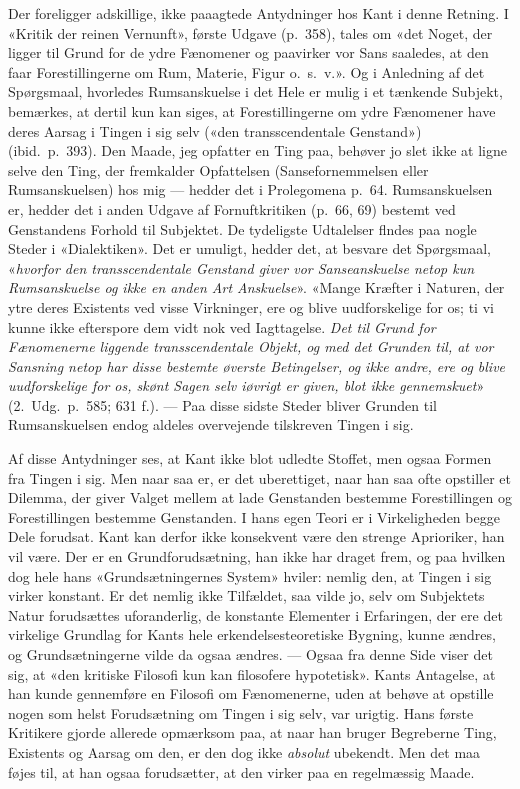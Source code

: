 \documentclass[12pt,a4paper]{article}
\newcommand{\apage}[1]{\marginnote{\footnotesize\textit{[#1]}}}
\begin{document}
Der foreligger adskillige, ikke paaagtede Antydninger hos Kant i denne
Retning. I «Kritik der reinen Vernunft», første Udgave (p.\ 358), tales
om «det Noget, der ligger til Grund for de ydre Fænomener og paavirker
vor Sans saaledes, at den faar Forestillingerne om Rum, Materie, Figur
o.\ s.\ v.». Og i Anledning af det Spørgsmaal, hvorledes Rumsanskuelse i
det Hele er mulig i et tænkende Subjekt, bemærkes, at dertil kun kan
siges, at Forestillingerne om ydre Fænomener have deres Aarsag i Tingen i
sig selv («den transscendentale Genstand») (ibid.\ p.\ 393). Den Maade,
jeg opfatter en Ting paa, behøver jo slet ikke at ligne selve den Ting,
der fremkalder Opfattelsen (Sansefornemmelsen eller Rumsanskuelsen) hos
mig --- hedder det i Prolegomena p.\ 64. Rumsanskuelsen er, hedder det i
anden Udgave af Fornuftkritiken (p.\ 66, 69) bestemt ved Genstandens
Forhold til Subjektet. De tydeligste Udtalelser flndes paa nogle Steder i
«Dialektiken». Det er umuligt, hedder det, at besvare det Spørgsmaal,
«\emph{hvorfor den transscendentale Genstand giver vor Sanseanskuelse netop kun
Rumsanskuelse og ikke en anden Art Anskuelse}». «Mange Kræfter i Naturen,
der ytre deres Existents ved visse Virkninger, ere og blive uudforskelige
for os; ti vi kunne ikke efterspore dem vidt nok ved Iagttagelse. \emph{Det til
Grund for Fænomenerne liggende transscendentale Objekt, og med det
Grunden til, at vor Sansning netop har disse bestemte øverste Betingelser,
og ikke andre, ere og blive uudforskelige for os, skønt Sagen selv
iøvrigt er given, blot ikke gennemskuet}» (2.\ Udg.\ p.\ 585; 631 f.). ---
Paa \apage{34} disse sidste Steder bliver Grunden til Rumsanskuelsen endog aldeles
overvejende tilskreven Tingen i sig.

Af disse Antydninger ses, at Kant ikke blot udledte Stoffet, men ogsaa
Formen fra Tingen i sig. Men naar saa er, er det uberettiget, naar han
saa ofte opstiller et Dilemma, der giver Valget mellem at lade Genstanden
bestemme Forestillingen og Forestillingen bestemme Genstanden. I hans
egen Teori er i Virkeligheden begge Dele forudsat. Kant kan derfor ikke
konsekvent være den strenge Aprioriker, han vil være. Der er en
Grundforudsætning, han ikke har draget frem, og paa hvilken dog hele hans
«Grundsætningernes System» hviler: nemlig den, at Tingen i sig virker
konstant. Er det nemlig ikke Tilfældet, saa vilde jo, selv om Subjektets
Natur forudsættes uforanderlig, de konstante Elementer i Erfaringen, der
ere det virkelige Grundlag for Kants hele erkendelsesteoretiske Bygning,
kunne ændres, og Grundsætningerne vilde da ogsaa ændres. --- Ogsaa fra
denne Side viser det sig, at «den kritiske Filosofi kun kan filosofere
hypotetisk». Kants Antagelse, at han kunde gennemføre en Filosofi om
Fænomenerne, uden at behøve at opstille nogen som helst Forudsætning om
Tingen i sig selv, var urigtig. Hans første Kritikere gjorde allerede
opmærksom paa, at naar han bruger Begreberne Ting, Existents og Aarsag om
den, er den dog ikke \emph{absolut} ubekendt. Men det maa føjes til, at han
ogsaa forudsætter, at den virker paa en regelmæssig Maade.
\end{document}
